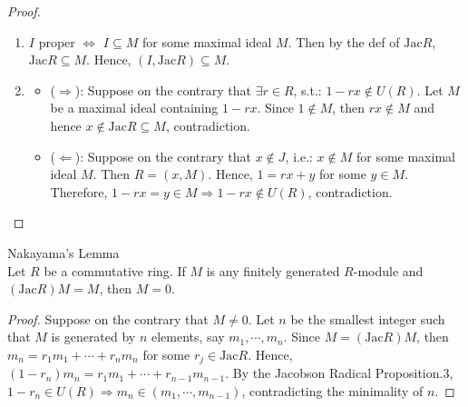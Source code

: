 \begin{proof}
    \begin{enumerate}
        \item $I$ proper $\Leftrightarrow$ $I\subseteq M$ for some maximal ideal $M$. Then by the def of $\text{Jac}R$, $\text{Jac}R \subseteq M$. Hence, $(I,\text{Jac} R) \subseteq M$.

        \item \begin{itemize}
            \item ($\Rightarrow$): Suppose on the contrary that $\exists r\in R$, s.t.: $1- rx \notin U(R)$. Let $M$ be a maximal ideal containing $1- rx$. Since $1 \notin M$, then $rx \notin M$ and hence $x \notin \text{Jac} R \subseteq M$, contradiction.

            \item ($\Leftarrow$): Suppose on the contrary that $x\notin J$, i.e.: $x \notin M$ for some maximal ideal $M$. Then $R= (x,M)$. Hence, $1 =rx+y$ for some $y \in M$. Therefore, $1-rx =y \in M \Rightarrow 1-rx \notin U(R)$, contradiction.
        \end{itemize}
    \end{enumerate}
\end{proof}

\begin{theorem}{Nakayama's Lemma}\\
Let $R$ be a commutative ring. If $M$ is any finitely generated $R$-module and $(\text{Jac} R) M=M$, then $M=0$.
\end{theorem}

\begin{proof}
    Suppose on the contrary that $M\neq 0$. Let $n$ be the smallest integer such that $M$ is generated by $n$ elements, say $m_1 ,\cdots,m_n$. Since $M =(\text{Jac} R) M$, then $m_n =r_1 m_1 +\cdots +r_nm_n$ for some $r_j \in \text{Jac}R$. Hence, $(1-r_n) m_n =r_1 m_1 +\cdots+ r_{n-1}m_{n-1}$. By the Jacobson Radical Proposition.3, $1- r_n \in U(R) \Rightarrow m_n \in (m_1 ,\cdots, m_{n-1})$, contradicting the minimality of $n$.
\end{proof}

